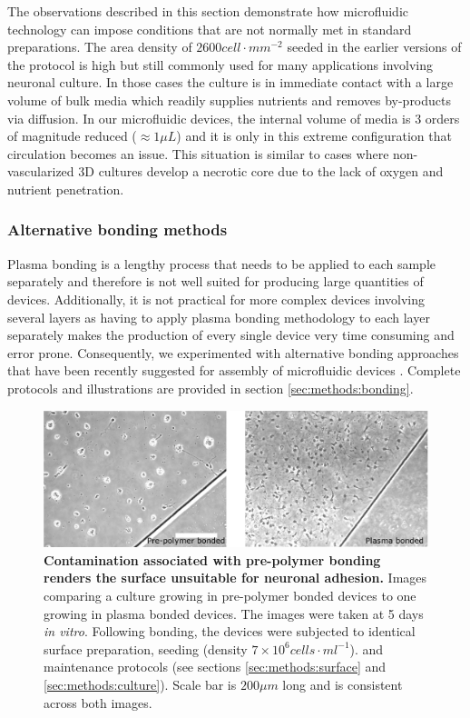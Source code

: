         The observations described in this section demonstrate how microfluidic technology can impose conditions that are not normally met in standard preparations. The area density of \(2600 cell\cdot mm^{-2}\) seeded in the earlier versions of the protocol is high but still commonly used for many applications involving neuronal culture. In those cases the culture is in immediate contact with a large volume of bulk media which readily supplies nutrients and removes by-products via diffusion. In our microfluidic devices, the internal volume of media is 3 orders of magnitude reduced (\(\approx 1 \mu L\)) and it is only in this extreme configuration that circulation becomes an issue. This situation is similar to cases where non-vascularized 3D cultures develop a necrotic core due to the lack of oxygen and nutrient penetration.

        \subsubsection{Alternative bonding methods}
        \label{sec:devices:bonding}
        Plasma bonding is a lengthy process that needs to be applied to each sample separately and therefore is not well suited for producing large quantities of devices. Additionally, it is not practical for more complex devices involving several layers as having to apply plasma bonding methodology to each layer separately makes the production of every single device very time consuming and error prone. Consequently, we experimented with alternative bonding approaches that have been recently suggested for assembly of microfluidic devices \cite{samel2007fabrication,nath2010rapid}. Complete protocols and illustrations are provided in section \ref{sec:methods:bonding}.

         \begin{figure}[h]
            \centering
            \includegraphics[width=15cm]{chapter4/figures/glueBonding/glueBondingComp.jpg}
            \caption[Effect of the pre-polymer bonding approach on the development of neuronal cultures in microfluidic devices]{\textbf{Contamination associated with pre-polymer bonding renders the surface unsuitable for neuronal adhesion.} Images comparing a culture growing in pre-polymer bonded devices to one growing in plasma bonded devices. The images were taken at 5 days \textit{in vitro}. Following bonding, the devices were subjected to identical surface preparation, seeding (density \(7\times10^6 cells\cdot ml^{-1}\)). and maintenance protocols (see sections \ref{sec:methods:surface} and \ref{sec:methods:culture}). Scale bar is \(200 \mu m\) long and is consistent across both images.}
            \label{fig:devices:glueBonding}
        \end{figure}


